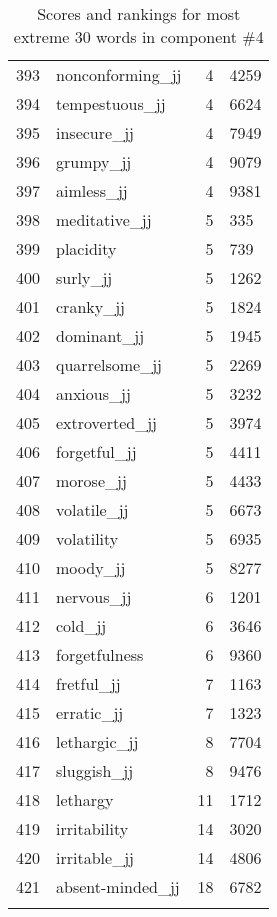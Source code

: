\begin{longtable}[!htbp]{| rlr@{.}l |}
    393 & nonconforming\_jj & 4 & 4259 \\
    394 & tempestuous\_jj & 4 & 6624 \\
    395 & insecure\_jj & 4 & 7949 \\
    396 & grumpy\_jj & 4 & 9079 \\
    397 & aimless\_jj & 4 & 9381 \\
    398 & meditative\_jj & 5 & 335 \\
    399 & placidity & 5 & 739 \\
    400 & surly\_jj & 5 & 1262 \\
    401 & cranky\_jj & 5 & 1824 \\
    402 & dominant\_jj & 5 & 1945 \\
    403 & quarrelsome\_jj & 5 & 2269 \\
    404 & anxious\_jj & 5 & 3232 \\
    405 & extroverted\_jj & 5 & 3974 \\
    406 & forgetful\_jj & 5 & 4411 \\
    407 & morose\_jj & 5 & 4433 \\
    408 & volatile\_jj & 5 & 6673 \\
    409 & volatility & 5 & 6935 \\
    410 & moody\_jj & 5 & 8277 \\
    411 & nervous\_jj & 6 & 1201 \\
    412 & cold\_jj & 6 & 3646 \\
    413 & forgetfulness & 6 & 9360 \\
    414 & fretful\_jj & 7 & 1163 \\
    415 & erratic\_jj & 7 & 1323 \\
    416 & lethargic\_jj & 8 & 7704 \\
    417 & sluggish\_jj & 8 & 9476 \\
    418 & lethargy & 11 & 1712 \\
    419 & irritability & 14 & 3020 \\
    420 & irritable\_jj & 14 & 4806 \\
    421 & absent-minded\_jj & 18 & 6782 \\
    \hline
    \caption{Scores and rankings for most extreme 30 words in component \#4} \\
\end{longtable}
